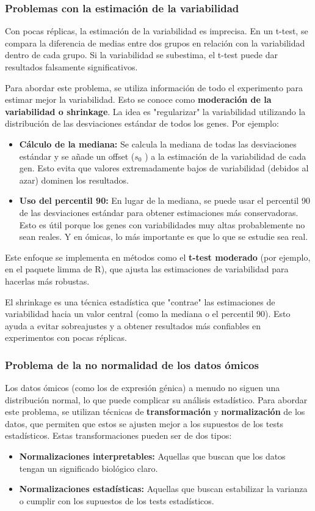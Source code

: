 \subsubsection{Problemas con la estimación de la variabilidad}
Con pocas réplicas, la estimación de la variabilidad es imprecisa. En un t-test, se compara la diferencia de medias entre dos grupos en relación con la variabilidad dentro de cada grupo. Si la variabilidad se subestima, el t-test puede dar resultados falsamente significativos.

Para abordar este problema, se utiliza información de todo el experimento para estimar mejor la variabilidad. Esto se conoce como \textbf{moderación de la variabilidad o shrinkage}. La idea es "regularizar" la variabilidad utilizando la distribución de las desviaciones estándar de todos los genes. Por ejemplo:
\begin{itemize}
\item \textbf{Cálculo de la mediana:}  Se calcula la mediana de todas las desviaciones estándar y se añade un offset ($s_0$ ) a la estimación de la variabilidad de cada gen. Esto evita que valores extremadamente bajos de variabilidad (debidos al azar) dominen los resultados. 
\item \textbf{Uso del percentil 90:} En lugar de la mediana, se puede usar el percentil 90 de las desviaciones estándar para obtener estimaciones más conservadoras. Esto es útil porque los genes con variabilidades muy altas probablemente no sean reales. Y en ómicas, lo más importante es que lo que se estudie sea real. 
\end{itemize}
Este enfoque se implementa en métodos como el \textbf{t-test moderado} (por ejemplo, en el paquete limma de R), que ajusta las estimaciones de variabilidad para hacerlas más robustas.

El shrinkage es una técnica estadística que "contrae" las estimaciones de variabilidad hacia un valor central (como la mediana o el percentil 90). Esto ayuda a evitar sobreajustes y a obtener resultados más confiables en experimentos con pocas réplicas.

\subsubsection{Problema de la no normalidad de los datos ómicos}
Los datos ómicos (como los de expresión génica) a menudo no siguen una distribución normal, lo que puede complicar su análisis estadístico. Para abordar este problema, se utilizan técnicas de \textbf{transformación} y \textbf{normalización} de los datos, que permiten que estos se ajusten mejor a los supuestos de los tests estadísticos. Estas transformaciones pueden ser de dos tipos:
\begin{itemize}
\item \textbf{Normalizaciones interpretables:} Aquellas que buscan que los datos tengan un significado biológico claro.
\item \textbf{Normalizaciones estadísticas:} Aquellas que buscan estabilizar la varianza o cumplir con los supuestos de los tests estadísticos.
\end{itemize}

